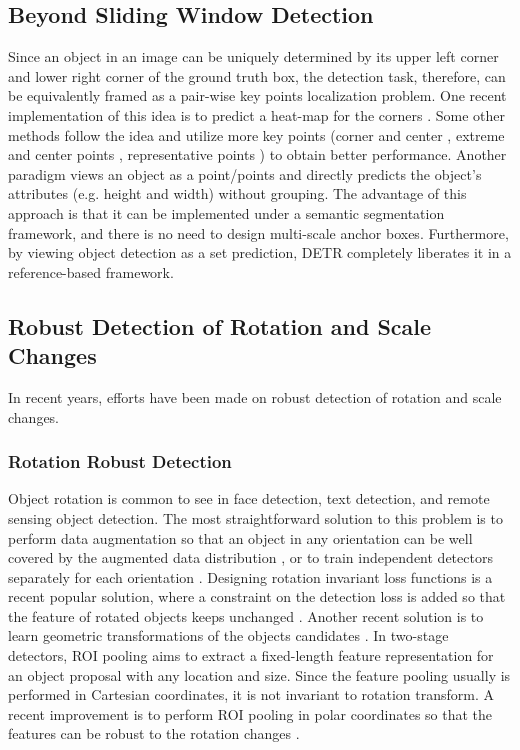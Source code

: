 \documentclass[lettersize,journal]{IEEEtran}
\begin{document}
\subsection{Beyond Sliding Window Detection}\label{subsec:beyond}
 

Since an object in an image can be uniquely determined by its upper left corner and lower right corner of the ground truth box, the detection task, therefore, can be equivalently framed as a pair-wise key points localization problem. One recent implementation of this idea is to predict a heat-map for the corners \cite{law2018cornernet}. Some other methods follow the idea and utilize more key points (corner and center \cite{duan2019centernet}, extreme and center points \cite{zhou2019bottom}, representative points \cite{yang2019reppoints}
) to obtain better performance. Another paradigm views an object as a point/points and directly predicts the object's attributes (e.g. height and width) without grouping. The advantage of this approach is that it can be implemented under a semantic segmentation framework, and there is no need to design multi-scale anchor boxes. Furthermore, by viewing object detection as a set prediction, DETR \cite{carion2020end, zhu2020deformable} completely liberates it in a reference-based framework.

\subsection{Robust Detection of Rotation and Scale Changes} \label{subsec:robust}

In recent years, efforts have been made on robust detection of rotation and scale changes.


\subsubsection{Rotation Robust Detection}\label{subsec:rotation_detec}

Object rotation is common to see in face detection, text detection, and remote sensing object detection. The most straightforward solution to this problem is to perform data augmentation so that an object in any orientation can be well covered by the augmented data distribution \cite{ICIP15-UCASAODDataset}, or to train independent detectors separately for each orientation \cite{GRSL18-Online, JPRS14-COPD}. Designing rotation invariant loss functions is a recent popular solution, where a constraint on the detection loss is added so that the feature of rotated objects keeps unchanged \cite{CVPR16-RIFD, TGRS16-RIFD, cheng2018learning}. Another recent solution is to learn geometric transformations of the objects candidates \cite{CVPR18-RIFaceProgressive, NIPS15-STN, ECCV16-TransformerFace, ding2019learning}. In two-stage detectors, ROI pooling aims to extract a fixed-length feature representation for an object proposal with any location and size. Since the feature pooling usually is performed in Cartesian coordinates, it is not invariant to rotation transform. A recent improvement is to perform ROI pooling in polar coordinates so that the features can be robust to the rotation changes \cite{GRSL18-Online}.
\end{document}
